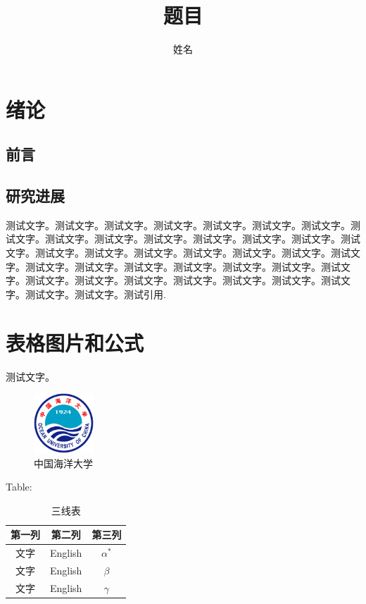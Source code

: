 \documentclass[zihao = -4,cn]{oucart}
\title{题目}
\author{姓名}
\begin{document}
\makecover   %

\makesignature  %

\makeabstract  %

\thispagestyle{empty}  %
\tableofcontents

\newpage   %
\setcounter{page}{1}   %


\section{绪论}
\subsection{前言}
\subsection{研究进展}
测试文字。测试文字。测试文字。测试文字。测试文字。测试文字。测试文字。测试文字。测试文字。测试文字。测试文字。测试文字。测试文字。测试文字。测试文字。测试文字。测试文字。测试文字。测试文字。测试文字。测试文字。测试文字。测试文字。测试文字。测试文字。测试文字。测试文字。测试文字。测试文字。测试文字。测试文字。测试文字。测试文字。测试文字。测试文字。测试文字。测试文字。测试文字。测试引用\cite{ouc}. 
\section{表格图片和公式}
测试文字。
\begin{figure}[!htbp]
    \centering
    \includegraphics[width = 0.2\textwidth]{assets/logo}
    \caption{中国海洋大学}
    \label{fig:ouc1}
\end{figure}

Table:
\begin{table}[!htbp]
\centering
\caption{三线表}
\begin{minipage}[t]{350pt}
\begin{tabular*}{350pt}{@{\extracolsep{\fill}}ccc}
\toprule
第一列 & 第二列 & 第三列 \\
\midrule
文字 & English & $\alpha^*$ \\
文字 & English & $\beta$ \\
文字 & English & $\gamma$\\
\bottomrule
\end{tabular*}
\footnotesize
\end{minipage}
\end{table}
\end{document}
